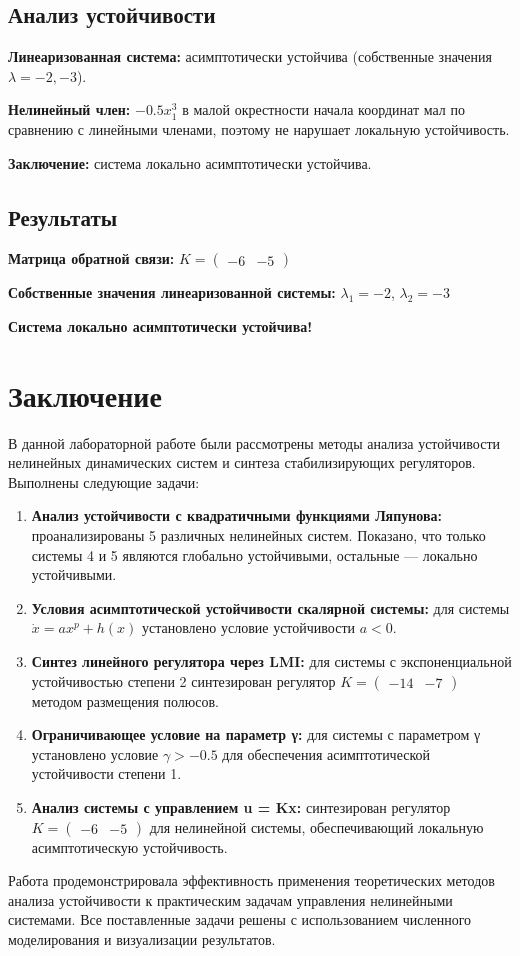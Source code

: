 \subsection{Анализ устойчивости}

\textbf{Линеаризованная система:} асимптотически устойчива (собственные значения $\lambda = -2, -3$).

\textbf{Нелинейный член:} $-0.5x_1^3$ в малой окрестности начала координат мал по сравнению с линейными членами, поэтому не нарушает локальную устойчивость.

\textbf{Заключение:} система локально асимптотически устойчива.

\subsection{Результаты}

\textbf{Матрица обратной связи:} $K = \begin{pmatrix} -6 & -5 \end{pmatrix}$

\textbf{Собственные значения линеаризованной системы:} $\lambda_1 = -2$, $\lambda_2 = -3$

\textbf{Система локально асимптотически устойчива!}

\section{Заключение}

В данной лабораторной работе были рассмотрены методы анализа устойчивости нелинейных динамических систем и синтеза стабилизирующих регуляторов. Выполнены следующие задачи:

\begin{enumerate}
\item \textbf{Анализ устойчивости с квадратичными функциями Ляпунова:} проанализированы 5 различных нелинейных систем. Показано, что только системы 4 и 5 являются глобально устойчивыми, остальные — локально устойчивыми.

\item \textbf{Условия асимптотической устойчивости скалярной системы:} для системы $\dot{x} = ax^p + h(x)$ установлено условие устойчивости $a < 0$.

\item \textbf{Синтез линейного регулятора через LMI:} для системы с экспоненциальной устойчивостью степени 2 синтезирован регулятор $K = \begin{pmatrix} -14 & -7 \end{pmatrix}$ методом размещения полюсов.

\item \textbf{Ограничивающее условие на параметр γ:} для системы с параметром γ установлено условие $\gamma > -0.5$ для обеспечения асимптотической устойчивости степени 1.

\item \textbf{Анализ системы с управлением u = Kx:} синтезирован регулятор $K = \begin{pmatrix} -6 & -5 \end{pmatrix}$ для нелинейной системы, обеспечивающий локальную асимптотическую устойчивость.
\end{enumerate}

Работа продемонстрировала эффективность применения теоретических методов анализа устойчивости к практическим задачам управления нелинейными системами. Все поставленные задачи решены с использованием численного моделирования и визуализации результатов.
